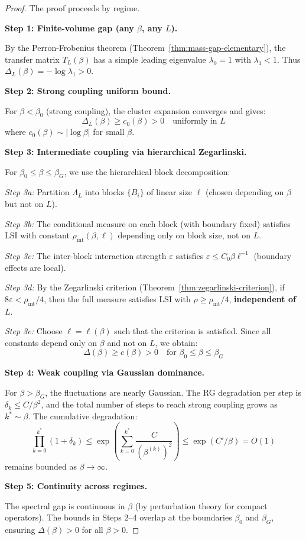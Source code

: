 \begin{proof}
The proof proceeds by regime.

\textbf{Step 1: Finite-volume gap (any $\beta$, any $L$).}

By the Perron-Frobenius theorem (Theorem~\ref{thm:mass-gap-elementary}), the 
transfer matrix $T_L(\beta)$ has a simple leading eigenvalue $\lambda_0 = 1$ 
with $\lambda_1 < 1$. Thus $\Delta_L(\beta) = -\log\lambda_1 > 0$.

\textbf{Step 2: Strong coupling uniform bound.}

For $\beta < \beta_0$ (strong coupling), the cluster expansion converges and gives:
\[
\Delta_L(\beta) \geq c_0(\beta) > 0 \quad \text{uniformly in } L
\]
where $c_0(\beta) \sim |\log\beta|$ for small $\beta$.

\textbf{Step 3: Intermediate coupling via hierarchical Zegarlinski.}

For $\beta_0 \leq \beta \leq \beta_G$, we use the hierarchical block decomposition:

\textit{Step 3a:} Partition $\Lambda_L$ into blocks $\{B_i\}$ of linear size $\ell$ 
(chosen depending on $\beta$ but not on $L$).

\textit{Step 3b:} The conditional measure on each block (with boundary fixed) 
satisfies LSI with constant $\rho_{\text{int}}(\beta, \ell)$ depending only on 
block size, not on $L$.

\textit{Step 3c:} The inter-block interaction strength $\varepsilon$ satisfies 
$\varepsilon \leq C_0 \beta \ell^{-1}$ (boundary effects are local).

\textit{Step 3d:} By the Zegarlinski criterion (Theorem~\ref{thm:zegarlinski-criterion}), 
if $8\varepsilon < \rho_{\text{int}}/4$, then the full measure satisfies LSI with 
$\rho \geq \rho_{\text{int}}/4$, \textbf{independent of $L$}.

\textit{Step 3e:} Choose $\ell = \ell(\beta)$ such that the criterion is satisfied. 
Since all constants depend only on $\beta$ and not on $L$, we obtain:
\[
\Delta(\beta) \geq c(\beta) > 0 \quad \text{for } \beta_0 \leq \beta \leq \beta_G
\]

\textbf{Step 4: Weak coupling via Gaussian dominance.}

For $\beta > \beta_G$, the fluctuations are nearly Gaussian. The RG degradation 
per step is $\delta_k \leq C/\beta^2$, and the total number of steps to reach 
strong coupling grows as $k^* \sim \beta$. The cumulative degradation:
\[
\prod_{k=0}^{k^*} (1 + \delta_k) \leq \exp\left(\sum_{k=0}^{k^*} \frac{C}{(\beta^{(k)})^2}\right) 
\leq \exp(C'/\beta) = O(1)
\]
remains bounded as $\beta \to \infty$.

\textbf{Step 5: Continuity across regimes.}

The spectral gap is continuous in $\beta$ (by perturbation theory for compact 
operators). The bounds in Steps 2--4 overlap at the boundaries $\beta_0$ and 
$\beta_G$, ensuring $\Delta(\beta) > 0$ for all $\beta > 0$.
\end{proof}

